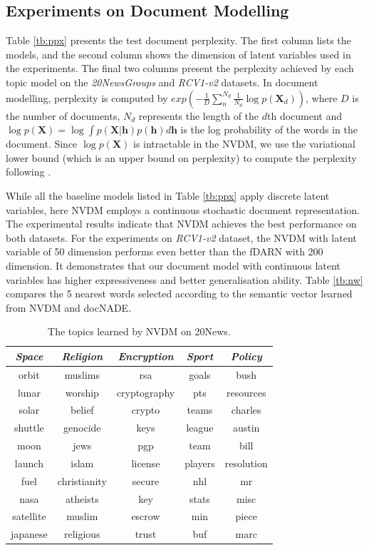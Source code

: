 \documentclass{article}
\newcommand{\tmmathbf}[1]{\ensuremath{\boldsymbol{#1}}}
\begin{document}
\subsection{Experiments on Document Modelling}
Table \ref{tb:ppx} presents the test document perplexity. The first column lists the models, and the second column shows the dimension of latent variables used in the experiments. 
The final two columns present the perplexity achieved by each topic model on the \textit{20NewsGroups} and \textit{RCV1-v2} datasets.
In document modelling, perplexity is computed by $exp(-\frac{1}{D}\sum_n^{N_{d}} \frac{1}{N_d} \log p(\tmmathbf{X}_d))$, where $D$ is the number of documents, $N_d$ represents the length of the $d$th document and $\log p(\tmmathbf{X}) = \log \int p(\tmmathbf{X}|\tmmathbf{h}) p(\tmmathbf{h})d\tmmathbf{h}$ is the log probability of the words in the document. 
Since $\log p(\tmmathbf{X})$ is intractable in the NVDM, we use the variational lower bound (which is an upper bound on perplexity) to compute the perplexity following \citet{mnih2014neural}.

While all the baseline models listed in Table \ref{tb:ppx} apply discrete latent variables, here NVDM employs a continuous stochastic document representation. The experimental results indicate that NVDM achieves the best performance on both datasets. 
For the experiments on \textit{RCV1-v2} dataset, the NVDM with latent variable of 50 dimension performs even better than the fDARN with 200 dimension. 
It demonstrates that our document model with continuous latent variables has higher expressiveness and better generalisation ability. Table \ref{tb:nw} compares the 5 nearest words selected according to the semantic vector learned from NVDM and docNADE.
\begin{table}[tb]
\addtolength{\tabcolsep}{-3.5pt}
  \small
  \centering
\begin{tabular}{c|c|c|c|c}
\toprule[1.2pt]
	\textit{\textbf{Space}}&		\textit{\textbf{Religion}}&	\textit{\textbf{Encryption}}&		\textit{\textbf{Sport}}&		\textit{\textbf{Policy}}	\\
\hline
	orbit&		muslims& 		rsa&			goals&		bush \\
	lunar&		worship& 		cryptography&	pts&		resources\\
	solar&		belief&  		crypto&		teams&		charles\\
	shuttle& 	genocide&		keys&		league&		austin\\
	moon&		jews&			pgp& 		team	& 		bill\\
	launch&		islam&			license& 	players&		resolution\\
	fuel&		christianity&	secure&		nhl&			mr\\
	nasa&   		atheists&		key& 		stats&		misc\\
	satellite&	muslim&			escrow& 		min& 		piece\\
	japanese&	religious&		trust&		buf& 		marc\\
\bottomrule[1.2pt]
\end{tabular} 
\caption{The topics learned by NVDM on 20News.}
\label{tb:topics}
\end{table}
\end{document}
